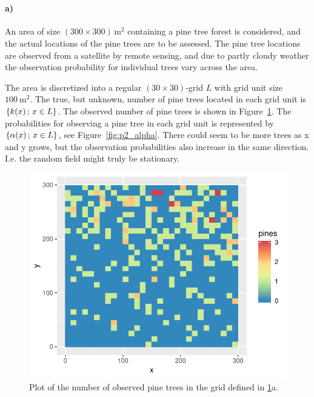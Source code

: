 \section{}
\label{sec:problem2}

\paragraph{a)}
An area of size $(300 \times 300) \, \si{\meter^2}$ containing a pine tree forest is considered, and the actual locations of the pine trees are to be assessed. The pine tree locations are observed from a satellite by remote sensing, and due to partly cloudy weather the observation probability for individual trees vary across the area.

The area is discretized into a regular $(30 \times 30)$-grid $L$ with grid unit size $\SI{100}{\meter^2}$. The true, but unknown, number of pine trees located in each grid unit is $\{k(x) \,;\, x \in L\}$. The observed number of pine trees is shown in Figure~\ref{fig:p2_pines}. The probabilities for observing a pine tree in each grid unit is represented by $\{\alpha(x) \,;\, x \in L\}$, see Figure~\ref{fig:p2_alpha}. There could seem to be more trees as x and y grows, but the observation probabilities also increase in the same direction. I.e. the random field might truly be stationary.

\begin{figure}
    \centering
    \includegraphics{figures/p2_pines.pdf}
    \caption{Plot of the number of observed pine trees in the grid defined in \ref{sec:problem2}a.}
    \label{fig:p2_pines}
\end{figure}

